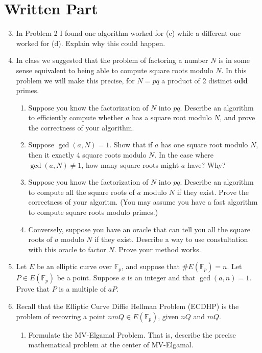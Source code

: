 \documentclass[11pt]{article}
\newcommand{\bF}{\mathbb{F}}
\begin{document}
\section*{Written Part}
\begin{enumerate}
  \setcounter{enumi}{2}
  \item{
  In Problem 2 I found one algorithm worked for (c) while a different one worked for (d).  Explain why this could happen.
  }
  \item{
  In class we suggested that the problem of factoring a number $N$ is in some sense equivalent to being able to compute square roots modulo $N$.  In
  this problem we will make this precise, for $N=pq$ a product of 2 distinct \textbf{odd} primes.
  \begin{enumerate}
    \item{
    Suppose you know the factorization of $N$ into $pq$.  Describe an algorithm to efficiently compute whether $a$ has a square root modulo $N$, and prove the correctness of your algorithm.
    }
    \item{
    Suppose $\gcd(a,N)=1$.  Show that if $a$ has one square root modulo $N$, then it exactly 4 square roots modulo $N$.  In the case where $\gcd(a,N)\not=1$, how many square roots might $a$ have? Why?
    }
    \item{
    Suppose you know the factorization of $N$ into $pq$.  Describe an algorithm to compute all the square roots of $a$ modulo $N$ if they exist.  Prove the correctness of your algoritm.  (You may assume you have a fast algorithm to compute square roots modulo primes.)
    }
    \item{
    Conversely, suppose you have an oracle that can tell you all the square roots of $a$ modulo $N$ if they exist.  Describe a way to use constultation with this oracle to factor $N$.  Prove your method works.
    }
  \end{enumerate}
  }
  \item{
  Let $E$ be an elliptic curve over $\bF_p$, and suppose that $\#E(\bF_p) = n$.  Let $P\in E(\bF_p)$ be a point.  Suppose $a$ is an integer and that $\gcd(a,n)=1$.  Prove that $P$ is a multiple of $aP$.
  }
  \item{
  Recall that the Elliptic Curve Diffie Hellman Problem (ECDHP) is the problem of recovring a point $nmQ\in E(\bF_p)$, given $nQ$ and $mQ$.
  \begin{enumerate}
    \item{
    Formulate the MV-Elgamal Problem.  That is, describe the precise mathematical problem at the center of MV-Elgamal.
}
\end{enumerate}}
\end{enumerate}
\end{document}
